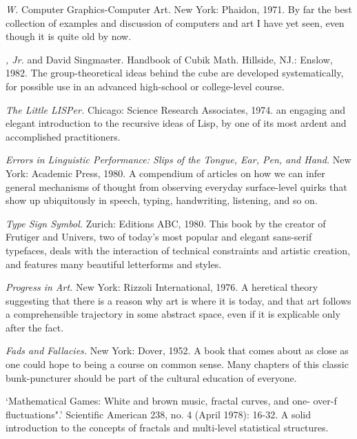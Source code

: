  {\sl W.} Computer Graphics-Computer Art. New York: Phaidon, 1971. By far the best collection of examples and discussion of computers and art I have yet seen, even though it is quite old by now.

 {\sl , Jr.} and David Singmaster. Handbook of Cubik Math. Hillside, NJ.: Enslow, 1982. The group-theoretical ideas behind the cube are developed systematically, for possible use in an advanced high-school or college-level course.

 {\sl The Little LISPer.} Chicago: Science Research Associates, 1974. an engaging and elegant introduction to the recursive ideas of Lisp, by one of its most ardent and accomplished practitioners.

 {\sl Errors in Linguistic Performance: Slips of the Tongue, Ear, Pen, and Hand.} New York: Academic Press, 1980. A compendium of articles on how we can infer general mechanisms of thought from observing everyday surface-level quirks that show up ubiquitously in speech, typing, handwriting, listening, and so on.

 {\sl Type Sign Symbol.} Zurich: Editions ABC, 1980. This book by the creator of Frutiger and Univers, two of today's most popular and elegant sans-serif typefaces, deals with the interaction of technical constraints and artistic creation, and features many beautiful letterforms and styles.

 {\sl Progress in Art.} New York: Rizzoli International, 1976. A heretical theory suggesting that there is a reason why art is where it is today, and that art follows a comprehensible trajectory in some abstract space, even if it is explicable only after the fact.

 {\sl Fads and Fallacies.} New York: Dover, 1952. A book that comes about as close as one could hope to being a course on common sense. Many chapters of this classic bunk-puncturer should be part of the cultural education of everyone.

 `Mathematical Games: White and brown music, fractal curves, and one- over-f fluctuations".' Scientific American 238, no. 4 (April 1978): 16-32. A solid introduction to the concepts of fractals and multi-level statistical structures.


